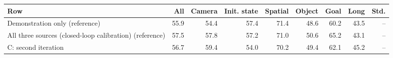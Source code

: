 \begin{tabular}{lrrrrrrrr}
\toprule
Row & All & Camera & Init. state & Spatial & Object & Goal & Long & Std. \\
\midrule
Demonstration only (reference) & 55.9 & 54.4 & 57.4 & 71.4 & 48.6 & 60.2 & 43.5 & -- \\
All three sources (closed-loop calibration) (reference) & 57.5 & 57.8 & 57.2 & 71.0 & 50.6 & 65.2 & 43.1 & -- \\
C: second iteration & 56.7 & 59.4 & 54.0 & 70.2 & 49.4 & 62.1 & 45.2 & -- \\
\bottomrule
\end{tabular}
